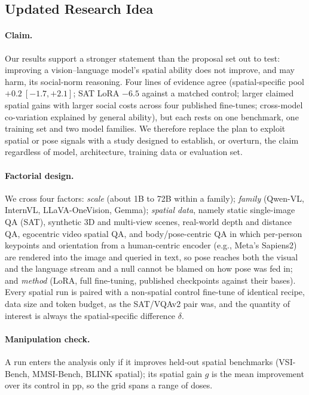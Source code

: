 \subsection{Updated Research Idea}
\label{sec:idea5-updated}

\paragraph{Claim.}
Our results support a stronger statement than the proposal set out to test: improving a vision--language model's spatial ability does not improve, and may harm, its social-norm reasoning. Four lines of evidence agree (spatial-specific pool $+0.2\ [-1.7,+2.1]$; SAT LoRA $-6.5$ against a matched control; larger claimed spatial gains with larger social costs across four published fine-tunes; cross-model co-variation explained by general ability), but each rests on one benchmark, one training set and two model families. We therefore replace the plan to exploit spatial or pose signals with a study designed to establish, or overturn, the claim regardless of model, architecture, training data or evaluation set.

\paragraph{Factorial design.}
We cross four factors: \emph{scale} (about 1B to 72B within a family); \emph{family} (Qwen-VL, InternVL, LLaVA-OneVision, Gemma); \emph{spatial data}, namely static single-image QA (SAT), synthetic 3D and multi-view scenes, real-world depth and distance QA, egocentric video spatial QA, and body/pose-centric QA in which per-person keypoints and orientation from a human-centric encoder (e.g., Meta's Sapiens2) are rendered into the image and queried in text, so pose reaches both the visual and the language stream and a null cannot be blamed on how pose was fed in; and \emph{method} (LoRA, full fine-tuning, published checkpoints against their bases). Every spatial run is paired with a non-spatial control fine-tune of identical recipe, data size and token budget, as the SAT/VQAv2 pair was, and the quantity of interest is always the spatial-specific difference $\delta$.

\paragraph{Manipulation check.}
A run enters the analysis only if it improves held-out spatial benchmarks (VSI-Bench, MMSI-Bench, BLINK spatial); its spatial gain $g$ is the mean improvement over its control in pp, so the grid spans a range of doses.

